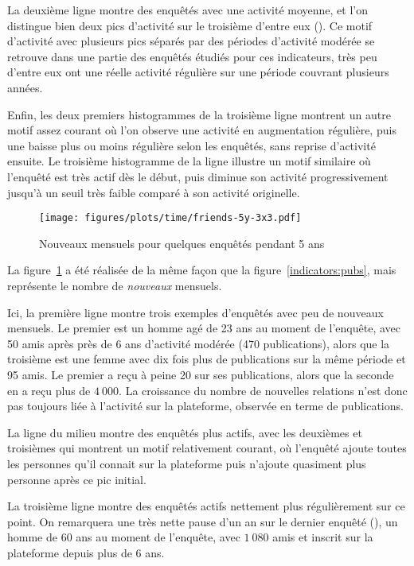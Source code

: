 La deuxième ligne montre des enquêtés avec une activité moyenne, et l’on
distingue bien deux pics d’activité sur le troisième d’entre eux
(). Ce motif d’activité avec plusieurs pics séparés par des
périodes d’activité modérée se retrouve dans une partie des enquêtés étudiés
pour ces indicateurs, très peu d’entre eux ont une réelle activité régulière
sur une période couvrant plusieurs années.

Enfin, les deux premiers histogrammes de la troisième ligne montrent un autre
motif assez courant où l’on observe une activité en augmentation régulière,
puis une baisse plus ou moins régulière selon les enquêtés, sans reprise
d’activité ensuite. Le troisième histogramme de la ligne illustre un motif
similaire où l’enquêté est très actif dès le début, puis diminue son activité
progressivement jusqu’à un seuil très faible comparé à son activité originelle.

\begin{figure}[ht]
    \label{indicators:friends}
    \begin{center}
        \texttt{[image: figures/plots/time/friends-5y-3x3.pdf]}
    \end{center}
    \caption{Nouveaux  mensuels pour quelques enquêtés pendant 5 ans}
\end{figure}

La figure~\ref{indicators:friends} a été réalisée de la même façon que la
figure~\ref{indicators:pubs}, mais représente le nombre de \emph{nouveaux}
 mensuels.

Ici, la première ligne montre trois exemples d’enquêtés avec peu de nouveaux
 mensuels. Le premier est un homme agé de 23 ans au moment de
l’enquête, avec 50 amis après près de 6 ans d’activité modérée (470
publications), alors que la troisième est une femme avec dix fois plus de
publications sur la même période et 95 amis. Le premier a reçu à peine 20
 sur ses publications, alors que la seconde en a reçu plus de $4~000$.
La croissance du nombre de nouvelles relations n’est donc pas toujours liée à
l’activité sur la plateforme, observée en terme de publications.

La ligne du milieu montre des enquêtés plus actifs, avec les deuxièmes et
troisièmes qui montrent un motif relativement courant, où l’enquêté ajoute
toutes les personnes qu’il connait sur la plateforme puis n’ajoute quasiment
plus personne après ce pic initial.

La troisième ligne montre des enquêtés actifs nettement plus régulièrement sur
ce point. On remarquera une très nette pause d’un an sur le dernier enquêté
(), un homme de 60 ans au moment de l’enquête, avec $1~080$ amis
et inscrit sur la plateforme depuis plus de 6 ans.


